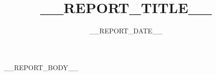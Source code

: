 \documentclass[12pt,a4paper]{ctexart}
\title{__REPORT_TITLE__}
\author{}
\date{__REPORT_DATE__}
\begin{document}
\maketitle
\tableofcontents
\newpage

__REPORT_BODY__
\end{document}
